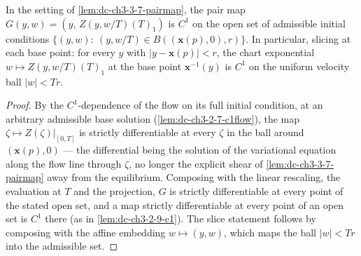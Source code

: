\begin{lemma}
  \label{lem:dc-ch3-3-7-c1pair}
  \leanok
  In the setting of \cref{lem:dc-ch3-3-7-pairmap}, the pair map
  $G(y,w)=(y,\,Z(y,w/T)(T)_1)$ is $C^1$ on the open set of admissible initial
  conditions $\{(y,w):\ (y,w/T)\in B((\mathbf{x}(p),0),r)\}$. In particular,
  slicing at each base point: for every $y$ with $|y-\mathbf{x}(p)|<r$, the
  chart exponential $w\mapsto Z(y,w/T)(T)_1$ at the base point
  $\mathbf{x}^{-1}(y)$ is $C^1$ on the uniform velocity ball $|w|<Tr$.
\end{lemma}
\begin{proof}
  \sketch
  \leanok
  By the $C^1$-dependence of the flow on its full initial condition, at an
  arbitrary admissible base solution (\cref{lem:dc-ch3-2-7-c1flow}), the map
  $\zeta\mapsto Z(\zeta)|_{[0,T]}$ is strictly differentiable at every $\zeta$
  in the ball around $(\mathbf{x}(p),0)$ — the differential being the solution
  of the variational equation along the flow line through $\zeta$, no longer
  the explicit shear of \cref{lem:dc-ch3-3-7-pairmap} away from the
  equilibrium. Composing with the linear rescaling, the evaluation at $T$ and
  the projection, $G$ is strictly differentiable at every point of the stated
  open set, and a map strictly differentiable at every point of an open set is
  $C^1$ there (as in \cref{lem:dc-ch3-2-9-c1}). The slice statement follows by
  composing with the affine embedding $w\mapsto(y,w)$, which maps the ball
  $|w|<Tr$ into the admissible set.
\end{proof}

